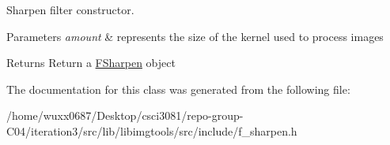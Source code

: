 Sharpen filter constructor. 


\begin{DoxyParams}{Parameters}
{\em amount} & represents the size of the kernel used to process images \\
\hline
\end{DoxyParams}
\begin{DoxyReturn}{Returns}
Return a \hyperlink{classimage__tools_1_1FSharpen}{F\+Sharpen} object 
\end{DoxyReturn}


The documentation for this class was generated from the following file\+:\begin{DoxyCompactItemize}
\item 
/home/wuxx0687/\+Desktop/csci3081/repo-\/group-\/\+C04/iteration3/src/lib/libimgtools/src/include/f\+\_\+sharpen.\+h\end{DoxyCompactItemize}
